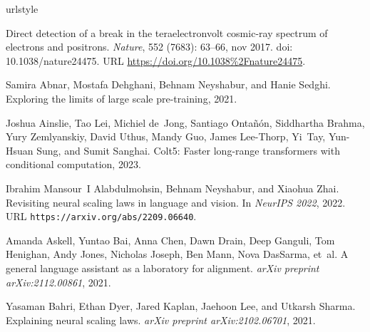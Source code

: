 \documentclass{article} %
\begin{document}
\fi


\clearpage

%



\begin{thebibliography}{62}
\providecommand{\natexlab}[1]{#1}
\providecommand{\url}[1]{\texttt{#1}}
\expandafter\ifx\csname urlstyle\endcsname\relax
  \providecommand{\doi}[1]{doi: #1}\else
  \providecommand{\doi}{doi: \begingroup \urlstyle{rm}\Url}\fi

Direct detection of a break in the teraelectronvolt cosmic-ray spectrum of
  electrons and positrons.
\newblock \emph{Nature}, 552 (7683): 63--66, nov 2017.
\newblock \doi{10.1038/nature24475}.
\newblock URL \url{https://doi.org/10.1038%2Fnature24475}.

Samira Abnar, Mostafa Dehghani, Behnam Neyshabur, and Hanie Sedghi.
\newblock Exploring the limits of large scale pre-training, 2021.

Joshua Ainslie, Tao Lei, Michiel de~Jong, Santiago Ontañón, Siddhartha
  Brahma, Yury Zemlyanskiy, David Uthus, Mandy Guo, James Lee-Thorp, Yi~Tay,
  Yun-Hsuan Sung, and Sumit Sanghai.
\newblock Colt5: Faster long-range transformers with conditional computation,
  2023.

Ibrahim Mansour~I Alabdulmohsin, Behnam Neyshabur, and Xiaohua Zhai.
\newblock Revisiting neural scaling laws in language and vision.
\newblock In \emph{NeurIPS 2022}, 2022.
\newblock URL \url{https://arxiv.org/abs/2209.06640}.

Amanda Askell, Yuntao Bai, Anna Chen, Dawn Drain, Deep Ganguli, Tom Henighan,
  Andy Jones, Nicholas Joseph, Ben Mann, Nova DasSarma, et~al.
\newblock A general language assistant as a laboratory for alignment.
\newblock \emph{arXiv preprint arXiv:2112.00861}, 2021.

Yasaman Bahri, Ethan Dyer, Jared Kaplan, Jaehoon Lee, and Utkarsh Sharma.
\newblock Explaining neural scaling laws.
\newblock \emph{arXiv preprint arXiv:2102.06701}, 2021.


\end{thebibliography}
\end{document}
